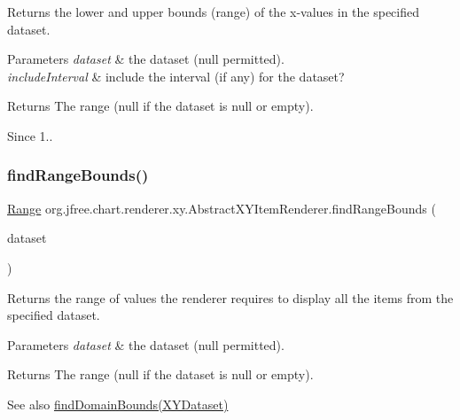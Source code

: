 Returns the lower and upper bounds (range) of the x-\/values in the specified dataset.


\begin{DoxyParams}{Parameters}
{\em dataset} & the dataset ({\ttfamily null} permitted). \\
\hline
{\em include\+Interval} & include the interval (if any) for the dataset?\\
\hline
\end{DoxyParams}
\begin{DoxyReturn}{Returns}
The range ({\ttfamily null} if the dataset is {\ttfamily null} or empty).
\end{DoxyReturn}
\begin{DoxySince}{Since}
1.. 
\end{DoxySince}
\mbox{\label{classorg_1_1jfree_1_1chart_1_1renderer_1_1xy_1_1_abstract_x_y_item_renderer_a5397cc245f962e8ae07189118297330b}} 
\subsubsection{\texorpdfstring{find\+Range\+Bounds()}{findRangeBounds()}\hspace{0.1cm}{\footnotesize\ttfamily [1/2]}}
{\footnotesize\ttfamily \mbox{\hyperlink{classorg_1_1jfree_1_1data_1_1_range}{Range}} org.\+jfree.\+chart.\+renderer.\+xy.\+Abstract\+X\+Y\+Item\+Renderer.\+find\+Range\+Bounds (\begin{DoxyParamCaption}\item[{\mbox{\hyperlink{interfaceorg_1_1jfree_1_1data_1_1xy_1_1_x_y_dataset}{X\+Y\+Dataset}}}]{dataset }\end{DoxyParamCaption})}

Returns the range of values the renderer requires to display all the items from the specified dataset.


\begin{DoxyParams}{Parameters}
{\em dataset} & the dataset ({\ttfamily null} permitted).\\
\hline
\end{DoxyParams}
\begin{DoxyReturn}{Returns}
The range ({\ttfamily null} if the dataset is {\ttfamily null} or empty).
\end{DoxyReturn}
\begin{DoxySeeAlso}{See also}
\mbox{\hyperlink{classorg_1_1jfree_1_1chart_1_1renderer_1_1xy_1_1_abstract_x_y_item_renderer_aa663388be3250653a6883e5c1fb4da7e}{find\+Domain\+Bounds(\+X\+Y\+Dataset)}} 
\end{DoxySeeAlso}


